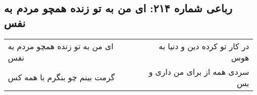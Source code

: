 \begin{center}
\section*{رباعی شماره ۲۱۴: ای من به تو زنده همچو مردم به نفس}
\label{sec:sh214}
\begin{longtable}{l p{0.5cm} r}
ای من به تو زنده همچو مردم به نفس
&&
در کار تو کرده دین و دنیا به هوس
\\
گرمت بینم چو بنگرم با همه کس
&&
سردی همه از برای من داری و بس
\\
\end{longtable}
\end{center}
